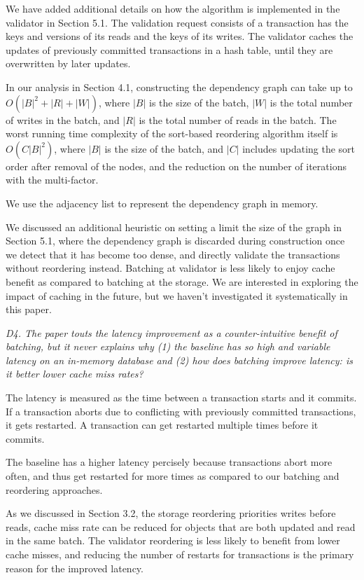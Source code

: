 \documentclass{article}
\begin{document}
\bigskip

We have added additional details on how the algorithm is implemented in the validator in Section 5.1. The validation request consists of a transaction has the keys and versions of its reads and the keys of its writes. The validator caches the updates of previously committed transactions in a hash table, until they are overwritten by later updates. 

In our analysis in Section 4.1, constructing the dependency graph can take up to $O(|B|^2+|R|+|W|)$, where $|B|$ is the size of the batch, $|W|$ is the total number of writes in the batch, and $|R|$ is the total number of reads in the batch. The worst running time complexity of the sort-based reordering algorithm itself is $O(C|B|^2)$, where $|B|$ is the size of the batch, and $|C|$ includes updating the sort order after removal of the nodes, and the reduction on the number of iterations with the multi-factor. 

We use the adjacency list to represent the dependency graph in memory. 

We discussed an additional heuristic on setting a  limit the size of the graph in Section 5.1, where the dependency graph is discarded during construction once we detect that it has become too dense, and directly validate the transactions without reordering instead. Batching at validator is less likely to enjoy cache benefit as compared to batching at the storage. We are interested in exploring the impact of caching in the future, but we haven't investigated it systematically in this paper.

\bigskip

\emph{D4. The paper touts the latency improvement as a counter-intuitive benefit of batching, but it never explains why (1) the baseline has so high and variable latency on an in-memory database and (2) how does batching improve latency: is it better lower cache miss rates?}

\bigskip
The latency is measured as the time between a transaction starts and it commits. If a transaction aborts due to conflicting with previously committed transactions, it gets restarted. A transaction can get restarted multiple times before it commits. 

The baseline has a higher latency percisely because transactions abort more often, and thus get restarted for more times as compared to our batching and reordering approaches. 

As we discussed in Section 3.2, the storage reordering priorities writes before reads, cache miss rate can be reduced for objects that are both updated and read in the same batch. The validator reordering is less likely to benefit from lower cache misses, and reducing the number of restarts for transactions is the primary reason for the improved latency.
\end{document}
